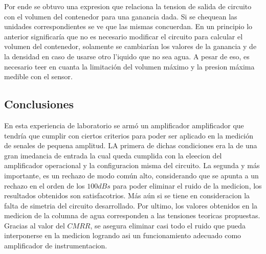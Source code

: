 Por ende se obtuvo una expresion que relaciona la tension de salida de circuito con el volumen del contenedor para una ganancia dada. Si se chequean las unidades correspondientes se ve que las mismas concuerdan. En un principio lo anterior significar\'ia que no es necesario modificar el circuito para calcular el volumen del contenedor, solamente se cambiar\'ian los valores de la ganancia y de la densidad en caso de usarse otro l'iquido que no sea agua. A pesar de eso, es necesario teer en cuanta la limitaci\'on del volumen m\'aximo y la presion m\'axima medible con el sensor.


\subsection{Conclusiones}

En esta experiencia de laboratorio se arm\'o un amplificador amplificador que tendr\'ia que cumplir con ciertos criterios para poder ser aplicado en la medici\'on de senales de pequena amplitud. LA primera de dichas condiciones era la de una gran imedancia de entrada la cual queda cumplida con la eleecion del amplificador operacional y la configuracion misma del circuito. La segunda y m\'as importante, es un rechazo de modo com\'un alto, considerando que se apunta a un rechazo en el orden de los $100dBs$ para poder eliminar el ruido de la medicion, los resultados obtenidos son satisfacotrios. M\'as a\'un si se tiene en consideracion la falta de simetria del circuito desarrollado. Por ultimo, los valores obtenidos en la medicion de la columna de agua corresponden a las tensiones teoricas propuestas. Gracias al valor del $CMRR$, se asegura eliminar casi todo el ruido que pueda interponerse en la medicion logrando asi un funcionamiento adecuado como amplificador de instrumentacion.
